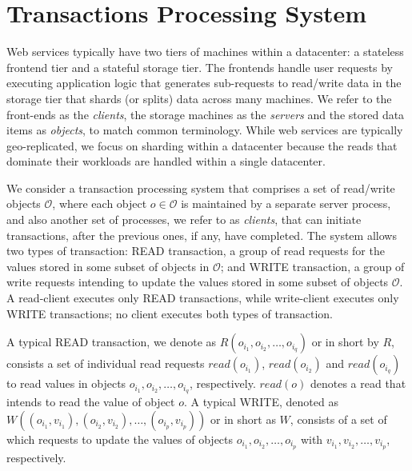 \section{Transactions Processing System}
\label{sec:prelim}
Web services typically have two tiers of machines within a datacenter: a stateless
frontend tier and a stateful storage tier.
The frontends handle user requests by executing application logic that generates
sub-requests to read/write data in the storage tier that shards (or splits) data across many machines.
We refer to the front-ends as the \textit{clients}, the storage machines as
the \textit{servers} and the stored data items as \textit{objects}, to match common terminology.
While web services are typically geo-replicated, we focus on sharding within a datacenter because the reads that dominate their workloads are handled within a single datacenter.

We consider a transaction processing system that comprises a set of read/write objects $\mathcal{O}$,
 where each object 
$o \in \mathcal{O}$ is maintained by a separate server process,
and also another set of processes, we refer to as \emph{clients}, that can initiate transactions, after the previous ones, if any, have completed.
 The system allows two types of transaction: {\sc READ} transaction, a group of read requests for the values stored in some subset of objects in $\mathcal{O}$; and {\sc WRITE} transaction, a group of write requests intending to update the values stored in some subset of objects  $\mathcal{O}$.
 A read-client executes only READ transactions, while write-client executes only WRITE transactions; no client executes both types of transaction.

A typical READ transaction, we denote as $\textit{R}(o_{i_1}, o_{i_2}, \ldots, o_{i_q})$ or in short by $R$, consists a set of individual read requests
  $read(o_{i_1})$,  $read(o_{i_2})$ and  $read(o_{i_q})$ to read values in objects $o_{i_1}, o_{i_2}, \ldots, o_{i_q}$, respectively.
   $read(o)$ denotes a read that intends to read the value of object $o$.
 A typical WRITE, denoted as   
 $\textit{W}((o_{i_1}, v_{i_1}), (o_{i_2}, v_{i_2}), \ldots, (o_{i_p}, v_{i_p}))$ or in short as $W$, consists of a set of which requests to update the values of objects $o_{i_1}, o_{i_2}, \ldots, o_{i_p}$ with  $v_{i_1}, v_{i_2}, \ldots, v_{i_p}$, respectively.
  
